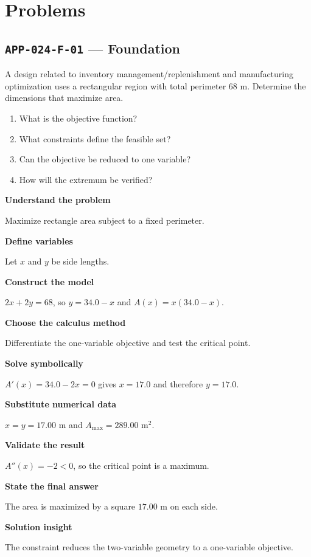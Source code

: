 \documentclass[11pt]{book}
\newcommand{\pid}[1]{\texttt{#1}}
\begin{document}
\section*{Problems}
\subsection*{\pid{APP-024-F-01} — Foundation}
\begin{problembox}
A design related to inventory management/replenishment and manufacturing optimization uses a rectangular region with total perimeter 68 m. Determine the dimensions that maximize area.
\end{problembox}
\begin{promptbox}\begin{enumerate}
\item What is the objective function?
\item What constraints define the feasible set?
\item Can the objective be reduced to one variable?
\item How will the extremum be verified?
\end{enumerate}\end{promptbox}
\begin{solutionbox}
\textbf{Understand the problem}\par Maximize rectangle area subject to a fixed perimeter.\par\medskip
\textbf{Define variables}\par Let $x$ and $y$ be side lengths.\par\medskip
\textbf{Construct the model}\par $2x+2y=68$, so $y=34.0-x$ and $A(x)=x(34.0-x)$.\par\medskip
\textbf{Choose the calculus method}\par Differentiate the one-variable objective and test the critical point.\par\medskip
\textbf{Solve symbolically}\par $A'(x)=34.0-2x=0$ gives $x=17.0$ and therefore $y=17.0$.\par\medskip
\textbf{Substitute numerical data}\par $x=y=17.00$ m and $A_{\max}=289.00$ m$^2$.\par\medskip
\textbf{Validate the result}\par $A''(x)=-2<0$, so the critical point is a maximum.\par\medskip
\textbf{State the final answer}\par The area is maximized by a square $17.00$ m on each side.\par\medskip
\textbf{Solution insight}\par The constraint reduces the two-variable geometry to a one-variable objective.\par\medskip
\end{solutionbox}
\end{document}
